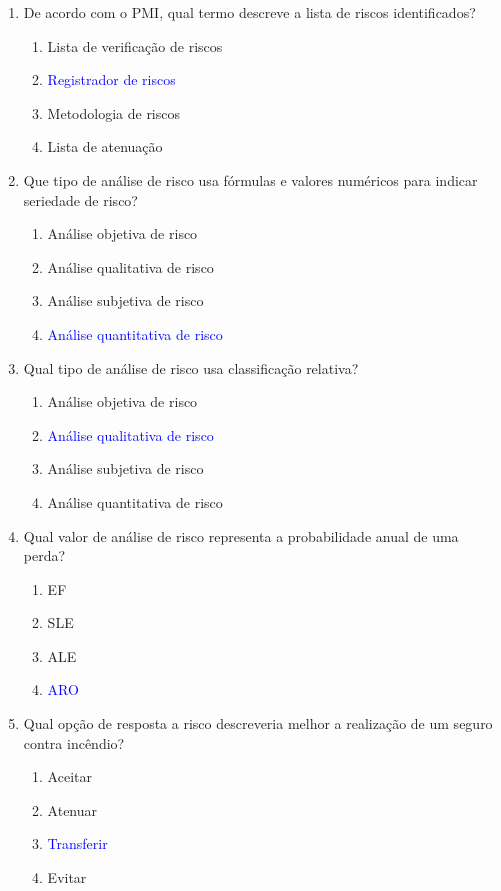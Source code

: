 \documentclass{report}
\begin{document}
	\begin{enumerate}
		\item De acordo com o PMI, qual termo descreve a lista de riscos identificados?
		\begin{enumerate}[label=(\alph*)]
			\item Lista de verificação de riscos
			\item \textcolor{blue}{Registrador de riscos}
			\item Metodologia de riscos
			\item Lista de atenuação
		\end{enumerate}
		
		\item Que tipo de análise de risco usa fórmulas e valores numéricos para indicar seriedade de risco?
		\begin{enumerate}[label=(\alph*)]
			\item Análise objetiva de risco
			\item Análise qualitativa de risco
			\item Análise subjetiva de risco
			\item \textcolor{blue}{Análise quantitativa de risco}
		\end{enumerate}
		
		\item Qual tipo de análise de risco usa classificação relativa?
		\begin{enumerate}[label=(\alph*)]
			\item Análise objetiva de risco
			\item \textcolor{blue}{Análise qualitativa de risco}
			\item Análise subjetiva de risco
			\item Análise quantitativa de risco
		\end{enumerate}
		
		\item Qual valor de análise de risco representa a probabilidade anual de uma perda?
		\begin{enumerate}[label=(\alph*)]
			\item EF
			\item SLE
			\item ALE
			\item \textcolor{blue}{ARO}
		\end{enumerate}
		
		\item Qual opção de resposta a risco descreveria melhor a realização de um seguro contra incêndio?
		\begin{enumerate}[label=(\alph*)]
			\item Aceitar
			\item Atenuar
			\item \textcolor{blue}{Transferir}
			\item Evitar
		\end{enumerate}
		

\end{enumerate}
\end{document}
